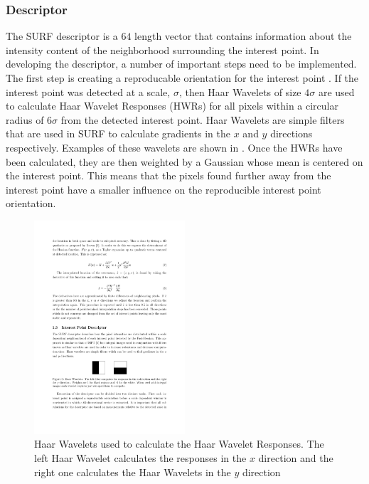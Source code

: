 \documentclass{report}
\begin{document}

\subsubsection{Descriptor}
\label{sec:2dsurfdescribe}
The SURF descriptor is a $64$ length vector that contains information about the intensity content of the neighborhood surrounding the interest point. In developing the descriptor, a number of important steps need to be implemented. The first step is creating a reproducable orientation for the interest point \cite{Bay2008}. If the interest point was detected at a scale, $\sigma$, then Haar Wavelets of size $4\sigma$ are used to calculate Haar Wavelet Responses (HWRs) for all pixels within a circular radius of $6\sigma$ from the detected interest point.  Haar Wavelets are simple filters that are used in SURF to calculate gradients in the $x$ and $y$ directions respectively. Examples of these wavelets are shown in  \cite{Evans2009}. Once the HWRs have been calculated, they are then weighted by a Gaussian whose mean is centered on the interest point. This means that the pixels found further away from the interest point have a smaller influence on the reproducible interest point orientation.\\


\begin{figure}[h!] 
  \centering
    \includegraphics[width=0.5\textwidth]{../Drawings/methods/SURF2D_HaarWavelets.pdf}
    \caption{Haar Wavelets used to calculate the Haar Wavelet Responses. The left Haar Wavelet calculates the responses in the $x$ direction and the right one calculates the Haar Wavelets in the $y$ direction}
    \label{fig:haar}
\end{figure}
\end{document}
